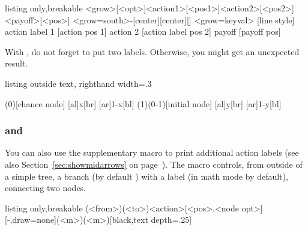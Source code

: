 \begin{tcblisting}{listing only,breakable}
  \istB<grow>[<opt>]{<action1>}[<pos1>]{<action2>}[<pos2>]{<payoff>}[<pos>]
  <grow=south>{-}{}[center]{}[center]{}[\istgrowdirection]
  <grow=keyval> %
  [line style] %
  {action label 1} %
  [action pos 1] %
  {action 2} %
  [action label pos 2] %
  {payoff} %
  [payoff pos] %
\end{tcblisting}

With \cmd{\istB}, do not forget to put two labels. Otherwise, you might get an unexpected result.

\begin{tcblisting}{listing outside text, righthand width=.3\linewidth}
\begin{istgame}[font=\footnotesize]
\xtdistance{15mm}{30mm}
\istroot(0)[chance node]
  [al]{x}[br]
  [ar]{1-x}[bl]
  \endist
\istroot(1)(0-1)[initial node]
  [al]{y}[br]
  [ar]{1-y}[bl]
  \endist
\end{istgame}
\end{tcblisting}

\subsubsection{\protect\cmd{\xtActionLabel} and \protect\cmd{\xtActionLabel*}}
\label{ssec:istbandxtActionLabel}

You can also use the supplementary macro \icmd{\xtActionLabel} to print additional action labels (see also Section~\ref{sec:showmidarrows} on page~\pageref{sec:showmidarrows}).
The macro \cmd{\xtActionLabel} controls, from outside of a simple tree, a branch (by default ) with a label (in math mode by default), connecting two nodes.

\begin{tcblisting}{listing only,breakable}
  (<from>)(<to>){<action>}[<pos>,<node opt>]
  [-,draw=none](<m>)(<m>){}[black,text depth=.25]
\end{tcblisting}


